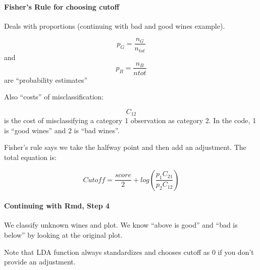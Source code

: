 \hypertarget{fishers-rule-for-choosing-cutoff}{%
\paragraph{Fisher's Rule for choosing
cutoff}\label{fishers-rule-for-choosing-cutoff}}

Deals with proportions (continuing with bad and good wines example).

\[p_G = \frac{n_G}{n_{tot}}\] and \[p_B = \frac{n_B}{n{tot}}\] are
``probability estimates''

Also ``costs'' of misclassification:

\[C_{12}\] is the cost of misclassifying a category 1 observation as
category 2. In the code, 1 is ``good wines'' and 2 is ``bad wines''.

Fisher's rule says we take the halfway point and then add an adjustment.
The total equation is:

\[Cutoff = \frac{score}{2} + log(\frac{p_1C_{21}}{p_2C_{12}})\]

\hypertarget{continuing-with-rmd-step-4}{%
\paragraph{Continuing with Rmd, Step
4}\label{continuing-with-rmd-step-4}}

We classify unknown wines and plot. We know ``above is good'' and ``bad
is below'' by looking at the original plot.

Note that LDA function always standardizes and chooses cutoff as 0 if
you don't provide an adjustment.
